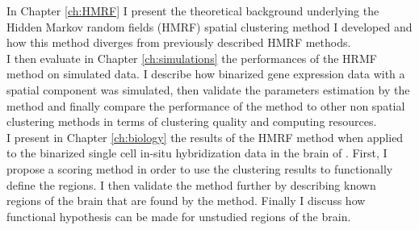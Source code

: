 	In Chapter \ref{ch:HMRF} I  present the theoretical background underlying the Hidden Markov random fields (HMRF) spatial clustering method I developed and how this method diverges from previously described HMRF methods. \\
	
	I then evaluate in Chapter \ref{ch:simulations} the performances of the HRMF method on simulated data. I describe how binarized gene expression data with a spatial component was simulated, then validate the parameters estimation by the method and finally compare the performance of the method to other non spatial clustering methods in terms of clustering quality and computing resources.\\
	
	I present in Chapter \ref{ch:biology} the results of the HMRF method when applied to the binarized single cell in-situ hybridization data in the brain of \platyfull{}. First, I propose a scoring method in order to use the clustering results to functionally define the regions. I then validate the method further by describing known regions of the brain that are found by the method. Finally I discuss how functional hypothesis can be made for unstudied regions of the brain.
	
	
	

%
%
%
%
%



